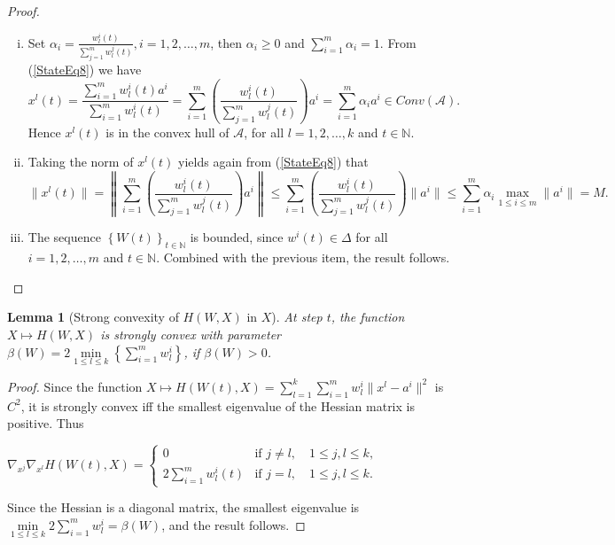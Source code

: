 \documentclass[11pt]{article}
\numberwithin{equation}{section}
\newtheorem{lemma}{Lemma}[proposition]
\begin{document}
\begin{proof}
\begin{enumerate}[(i)]
	\item  Set $\alpha_i = \frac{ w^i_l(t)}{\sum_{j=1}^{m} w^j_l(t)}, i=1, 2, \ldots ,m$, then $\alpha_i \geq 0$ and $\sum\limits_{i=1}^{m} \alpha_i =1$. From (\ref{StateEq8}) we have
	\begin{equation*}
		x^l(t) = \frac{\sum_{i=1}^{m} w^i_l(t) a^i}{\sum_{i=1}^{m} w^i_l(t)} 
		= \sum_{i=1}^{m} \left( \frac{ w^i_l(t)}{\sum_{j=1}^{m} w^j_l(t)} \right) a^i 
		= \sum\limits_{i=1}^{m} \alpha_i a^i \in Conv(\mathcal{A}).
	\end{equation*}
	Hence $x^l(t)$ is in the convex hull of $\mathcal{A}$, for all $l = 1, 2, \ldots, k$ and $t \in \mathbb{N}$.

	\item
	Taking the norm of $x^l(t)$ yields again from (\ref{StateEq8}) that
	\begin{equation*}
		\| x^l(t) \| = \left\lVert \sum_{i=1}^{m} \left( \frac{ w^i_l(t)}{\sum_{j=1}^{m} w^j_l(t)} \right) a^i \right\lVert
		\leq \sum_{i=1}^{m} \left( \frac{ w^i_l(t)}{\sum_{j=1}^{m} w^j_l(t)} \right) \| a^i \|
		\leq \sum_{i=1}^{m} \alpha_i \max\limits_{1 \leq i \leq m} \| a^i \| = M .
	\end{equation*}
	\item The sequence $\left\lbrace W(t) \right\rbrace_{t \in \mathbb{N}}$ is bounded, since $w^i(t) \in \Delta$ for all $i=1, 2, \ldots ,m$ and $t \in \mathbb{N}$. Combined with the previous item, the result follows. 
\end{enumerate}
\end{proof}

\begin{lemma}[Strong convexity of $H(W,X)$ in $X$] \label{StateEq14}
At step $t$, the function $X \mapsto H(W,X)$ is strongly convex with parameter $\beta(W) = 2 \min\limits_{1 \leq l \leq k} \left\lbrace \sum\limits_{i=1}^{m} w^i_l\right \rbrace$, if $\beta(W) > 0$.
\end{lemma}

\begin{proof}
Since the function $X \mapsto H(W(t),X) = 
\sum\limits_{l=1}^{k} \sum\limits_{i=1}^{m} w^i_l \|x^l - a^i\|^2$ is $C^2$, it is strongly convex iff the smallest eigenvalue of the Hessian matrix is positive. Thus

\begin{center}
$\nabla_{x^j} \nabla_{x^l} H(W(t),X) = 
\begin{cases} 0 &\mbox{if } j \neq l, \quad 1 \leq j,l \leq k ,
\\ 2\sum\limits_{i=1}^{m} w^i_l(t) &\mbox{if } j = l, \quad 1 \leq j,l \leq k. \end{cases} $
\end{center}

Since the Hessian is a diagonal matrix, the smallest eigenvalue is $\min\limits_{1 \leq l \leq k} 2\sum\limits_{i=1}^{m} w^i_l = \beta(W)$, and the result follows.
\end{proof}
\end{document}
